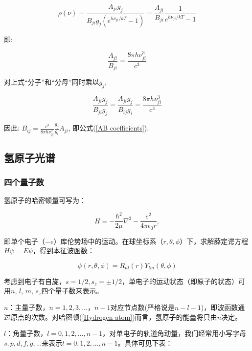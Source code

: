 \begin{equation*}
\rho(\nu)=\frac{A_{ji}g_j}{B_{ji}g_j
(e^{h\nu_{ji}/kT}-1)}=\frac{A_{ji}}{B_{ji}}\frac{1}{e^{h\nu_{ji}/kT}-1}
\end{equation*}

即:

\begin{equation*}
\frac{A_{ji}}{B_{ji}}=\frac{{8\pi h\nu_{ji} ^3 }}{{c^3 }}
\end{equation*}

对上式``分子''和``分母''同时乘以$g_j$,

\begin{equation*}
\frac{A_{ji}g_j}{B_{ji}g_j} =
\frac{A_{ji}g_j}{B_{ij}g_i}=\frac{{8\pi h\nu_{ji} ^3 }}{{c^3 }}
\end{equation*}


因此: $B_{ij}= \frac{c^3}{8 \pi h \nu_{ji}^3} \frac{g_j}{g_i}
A_{ji}$, 即公式(\ref{AB coefficients}).

\subsection{氢原子光谱}

\subsubsection{四个量子数}

氢原子的哈密顿量可写为：

\begin{equation}\label{Hydrogen atom}
    H=-\frac{\hbar^2}{2 \mu} \nabla^2 - \frac{e^2}{4\pi\epsilon_0 r},
\end{equation}

即单个电子（$-e$）库伦势场中的运动。在球坐标系（$r,\theta,\phi$）下，求解薛定谔方程$H
\psi = E \psi$，得到本征波函数：

\begin{equation}\label{Wave Function for H atom}
    \psi(r, \theta, \phi) = R_{nl}(r) Y_{lm}(\theta,\phi)
\end{equation}

考虑到电子有自旋，$s=1/2, s_z= \pm
1/2$，单电子的运动状态（即原子的状态）可用$n$, $l$, $m$,
$s_z$四个量子数来表示。

$n$：主量子数，$n=1,2,3,...$，$n-1$对应节点数(严格说是$n-l-1$)，即波函数通过原点的次数。对哈密顿(\ref{Hydrogen
atom})而言，氢原子的能量将只由$n$决定。

$l$：角量子数，$l =
0,1,2,...,n-1$，对单电子的轨道角动量，我们经常用小写字母$s, p, d, f,
g, ...$来表示$l = 0,1,2,...,n-1$。具体可见下表：


